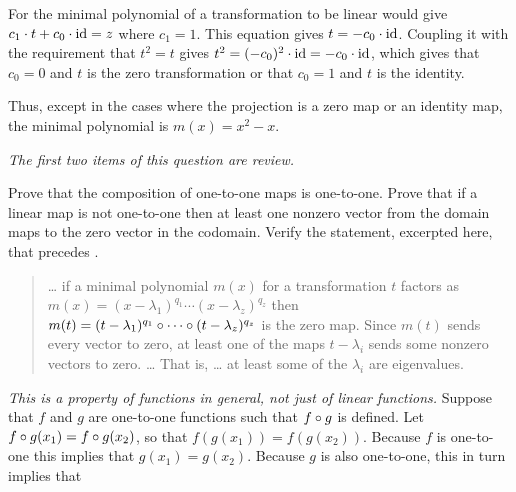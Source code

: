 \begin{exercises}
\begin{answer}
      For the minimal polynomial of a transformation to be linear would give 
      $c_1\cdot t+c_0\cdot\operatorname{id}=z$ where $c_1=1$.
      This equation gives $t=-c_0\cdot \operatorname{id}$.
      Coupling it with the requirement that $t^2=t$ gives
      $t^2=(-c_0)^2\cdot\operatorname{id}=-c_0\cdot\operatorname{id}$, which gives that
      $c_0=0$ and $t$ is the zero transformation or that $c_0=1$ and
      $t$ is the identity.       

      Thus, except in the cases where the projection is a zero map or an
      identity map, the minimal polynomial is $m(x)=x^2-x$. 
    \end{answer}
  \item \label{exer:SomeRootsMinPolyAreEigs}
    \textit{The first two items of this question are review.}
    \begin{exparts}
      \partsitem Prove that the composition of one-to-one maps is
        one-to-one.
      \partsitem Prove that if a linear map is not one-to-one then
        at least one nonzero vector from the domain maps to the 
        zero vector in the codomain.
      \partsitem Verify the statement, excerpted here, that
         precedes .
         \begin{quotation}
           \noindent \ldots{} 
           if a minimal polynomial $m(x)$ for a transformation $t$ 
           factors as
           $m(x)=(x-\lambda_1)^{q_1}\cdots (x-\lambda_z)^{q_z}$
           then 
           \( m(t)=(t-\lambda_1)^{q_1}\mathbin{\circ} \cdots\mathbin{\circ} 
                                                        (t-\lambda_z)^{q_z} \) 
          is the zero map. 
          Since \( m(t) \) sends every vector to zero, at least
          one of the maps \( t-\lambda_i \)  sends some
          nonzero vectors to zero.  \ldots{}
          That is, \ldots{} 
          at least some of the \( \lambda_i \) are eigenvalues.
        \end{quotation}
    \end{exparts}
    \begin{answer}
      \begin{exparts}
       \partsitem \textit{This is a property of functions in general,
          not just of linear functions.}
          Suppose that $f$ and $g$ are one-to-one functions such that
          $f\mathbin{\circ} g$ is defined.
          Let $f\mathbin{\circ} g(x_1)=f\mathbin{\circ} g(x_2)$, so that
          $f(g(x_1))=f(g(x_2))$.
          Because $f$ is one-to-one this implies that $g(x_1)=g(x_2)$.
          Because $g$ is also one-to-one, this in turn implies that

\end{exparts}
\end{answer}
\end{exercises}
